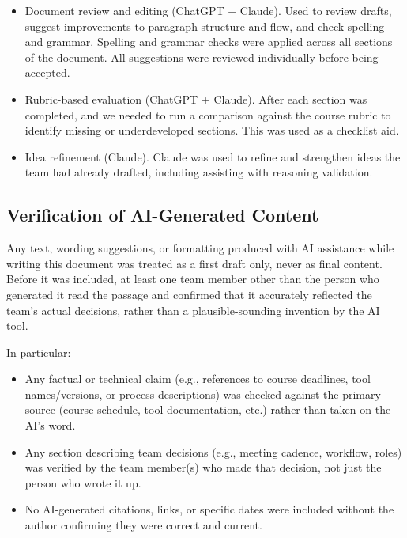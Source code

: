 \documentclass{article}
\begin{document}
\begin{itemize}
  \item Document review and editing (ChatGPT + Claude). Used to review 
  drafts, suggest improvements to paragraph structure and flow, and check
  spelling and grammar.
  Spelling and grammar checks were applied across all sections of the
  document. All suggestions were reviewed individually before being accepted.

  \item Rubric-based evaluation (ChatGPT + Claude). After each section was completed, and we needed to run a comparison
  against the course rubric to identify missing or underdeveloped sections.
  This was used as a checklist aid. 

  \item Idea refinement (Claude). Claude was used to refine and strengthen
  ideas the team had already drafted, including assisting with reasoning validation.
\end{itemize}

\subsection{Verification of AI-Generated Content}

Any text, wording suggestions, or formatting produced with AI assistance while
writing this document was treated as a first draft only, never as final
content. Before it was included, at least one team member other than the
person who generated it read the passage and confirmed that it accurately
reflected the team's actual decisions, rather than a plausible-sounding
invention by the AI tool.

In particular:
\begin{itemize}
  \item Any factual or technical claim (e.g., references to course deadlines,
  tool names/versions, or process descriptions) was checked against the
  primary source (course schedule, tool documentation, etc.) rather than
  taken on the AI's word.
  \item Any section describing team decisions (e.g., meeting cadence,
  workflow, roles) was verified by the team member(s) who made that decision,
  not just the person who wrote it up.
  \item No AI-generated citations, links, or specific dates were included
  without the author confirming they were correct and current.
\end{itemize}
\end{document}
